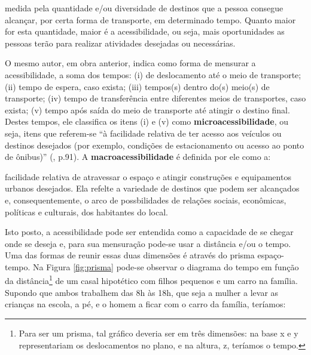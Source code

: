 \begin{citacao}
medida pela quantidade e/ou diversidade de destinos que a pessoa consegue alcançar, por certa forma de transporte, em determinado tempo. Quanto maior for esta quantidade, maior é a acessibilidade, ou seja, mais oportunidades as pessoas terão para realizar atividades desejadas ou necessárias. \cite[p.42]{VASCONCELLOS2012}
\end{citacao}

O mesmo autor, em obra anterior, indica como forma de mensurar a acessibilidade, a soma dos tempos: (i) de deslocamento até o meio de transporte; (ii) tempo de espera, caso exista; (iii) tempos(s) dentro do(s) meio(s) de transporte; (iv) tempo de transferência entre diferentes meios de transportes, caso exista; (v) tempo após saída do meio de transporte até atingir o destino final. Destes tempos, ele classifica os itens (i) e (v) como \textbf{microacessibilidade}, ou seja, itens que referem-se ``à facilidade relativa de ter acesso aos veículos ou destinos desejados (por exemplo, condições de estacionamento ou acesso ao ponto de ônibus)'' (\citeyear{VASCONCELLOS2001}, p.91). A \textbf{macroacessibilidade} é definida por ele como a:

\begin{citacao}
facilidade relativa de atravessar o espaço e atingir construções e equipamentos urbanos desejados. Ela refelte a variedade de destinos que podem ser alcançados e, consequentemente, o arco de possbilidades de relações sociais, econômicas, políticas e culturais, dos habitantes do local. \cite[p.91]{VASCONCELLOS2001}
\end{citacao}

Isto posto, a acessibilidade pode ser entendida como a capacidade de se chegar onde se deseja e, para sua mensuração pode-se usar a distância e/ou o tempo. Uma das formas de reunir essas duas dimensões é através do prisma espaço-tempo. Na Figura \ref{fig:prisma} pode-se observar o diagrama do tempo em função da distância\footnote{Para ser um prisma, tal gráfico deveria ser em três dimensões: na base x e y representariam os deslocamentos no plano, e na altura, z, teríamos o tempo.} de um casal hipotético com filhos pequenos e um carro na família. Supondo que ambos trabalhem das 8h às 18h, que seja a mulher a levar as crianças na escola, a pé, e o homem a ficar com o carro da família, teríamos:

